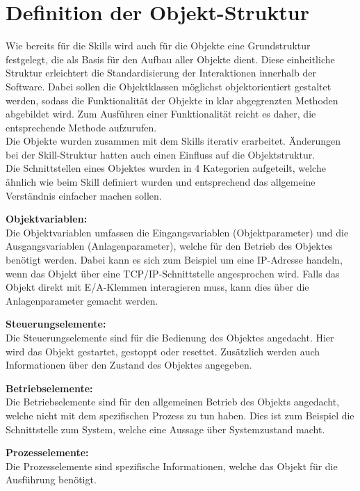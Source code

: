 \section{Definition der Objekt-Struktur} \label{Objektstruktur}

	Wie bereits für die Skills wird auch für die Objekte eine Grundstruktur festgelegt, die als Basis für den Aufbau aller Objekte dient. Diese einheitliche Struktur erleichtert die Standardisierung der Interaktionen innerhalb der Software. Dabei sollen die Objektklassen möglichst objektorientiert gestaltet werden, sodass die Funktionalität der Objekte in klar abgegrenzten Methoden abgebildet wird. Zum Ausführen einer Funktionalität reicht es daher, die entsprechende Methode aufzurufen. 
	\\
	Die Objekte wurden zusammen mit dem Skills iterativ erarbeitet. Änderungen bei der Skill-Struktur hatten auch einen Einfluss auf die Objektstruktur. 
	\\
	Die Schnittstellen eines Objektes wurden in 4 Kategorien aufgeteilt, welche ähnlich wie beim Skill definiert wurden und entsprechend das allgemeine Verständnis einfacher machen sollen. 
	
	\textbf{Objektvariablen:}
	\vspace{2mm} 
	\\
	Die Objektvariablen umfassen die Eingangsvariablen (Objektparameter) und die Ausgangsvariablen (Anlagenparameter), welche für den Betrieb des Objektes benötigt werden. Dabei kann es sich zum Beispiel um eine IP-Adresse handeln, wenn das Objekt über eine TCP/IP-Schnittstelle angesprochen wird. Falls das Objekt direkt mit E/A-Klemmen interagieren muss, kann dies über die Anlagenparameter gemacht werden. 
	
	
	\textbf{Steuerungselemente:}
	\vspace{2mm} 
	\\
	Die Steuerungselemente sind für die Bedienung des Objektes angedacht. Hier wird das Objekt gestartet, gestoppt oder resettet. Zusätzlich werden auch Informationen über den Zustand des Objektes angegeben.
	
	
	\textbf{Betriebselemente:}
	\vspace{2mm} 
	\\
	Die Betriebselemente sind für den allgemeinen Betrieb des Objekts angedacht, welche nicht mit dem spezifischen Prozess zu tun haben. Dies ist zum Beispiel die Schnittstelle zum System, welche eine Aussage über Systemzustand macht.
	
	
	\textbf{Prozesselemente:}
	\vspace{2mm} 
	\\
	Die Prozesselemente sind spezifische Informationen, welche das Objekt für die Ausführung benötigt.
	
